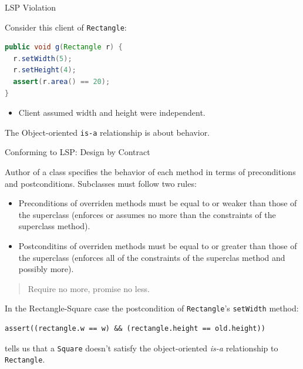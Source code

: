 \documentclass{beamer}
\begin{document}
\begin{frame}[fragile]{LSP Violation}


Consider this client of {\tt Rectangle}:
\begin{lstlisting}[language=Java]
public void g(Rectangle r) {
  r.setWidth(5);
  r.setHeight(4);
  assert(r.area() == 20);
}
\end{lstlisting}

\begin{itemize}
\item Client assumed width and height were independent.
\end{itemize}
The Object-oriented {\tt is-a} relationship is about behavior.

\end{frame}

\begin{frame}[fragile]{Conforming to LSP: Design by Contract}


Author of a class specifies the behavior of each method in terms of preconditions and postconditions.  Subclasses must follow two rules:
\begin{itemize}
\item Preconditions of overriden methods must be equal to or weaker than those of the superclass (enforces or assumes no more than the constraints of the superclass method).
\item Postconditins of overriden methods must be equal to or greater than those of the superclass (enforces all of the constraints of the superclas method and possibly more).
\end{itemize}

\begin{quote}
Require no more, promise no less.
\end{quote}

In the Rectangle-Square case the postcondition of {\tt Rectangle}'s {\tt setWidth} method:
\begin{lstlisting}
assert((rectangle.w == w) && (rectangle.height == old.height))
\end{lstlisting}
tells us that a {\tt Square} doesn't satisfy the object-oriented {\it is-a} relationship to {\tt Rectangle}.

\end{frame}
\end{document}
